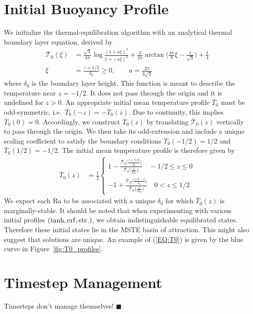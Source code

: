 \documentclass[reprint,amsmath,amssymb,aps]{revtex4-1}
\newcommand\Ra{\mathrm{Ra}}
\newcommand{\eq}[1]{(\ref{#1})}
\begin{document}
\section{Initial Buoyancy Profile} \label{sec:initial_profile}
We initialize the thermal-equilibration algorithm with an analytical thermal boundary layer equation, derived by \cite{Shishkina} 
\begin{align}
    \bar{\mathcal{T}}_0(\xi) &= \frac{\sqrt{3}}{4\pi} \log \frac{(1 + a\xi)^3}{1 + (a\xi)^3} + \frac{3}{2\pi} \arctan \Big( \frac{4\pi}{9}\xi - \frac{1}{\sqrt{3}} \Big) + \frac{1}{4} \nonumber \\
    \xi &= \frac{z + 1/2}{\delta_0} \geq 0, \qquad a = \frac{2\pi}{3\sqrt{3}}\label{EQ:T0}
\end{align}
where $\delta_0$ is the boundary layer height. 
This function is meant to describe the temperature near $z = -1/2$.
It does not pass through the origin and it is undefined for $z > 0$. 
An appropriate initial mean temperature profile $\bar{T}_0$ must be odd-symmetric, i.e.~$\bar{T}_0(-z) = -\bar{T}_0(z)$.
Due to continuity, this implies $\bar{T}_0(0) = 0$.
Accordingly, we construct $\bar{T}_0(z)$ by translating $\bar{\mathcal{T}}_0(z)$ vertically to pass through the origin.
We then take its odd-extension and include a unique scaling coefficient to satisfy the boundary conditions $\bar{T}_0(-1/2) = 1/2$ and $\bar{T}_0(1/2) = -1/2$.
The initial mean temperature profile is therefore given by
\begin{align*}
    \bar{T}_0(z) &= \frac{1}{2} \begin{cases}
        1 - \frac{\bar{\mathcal{T}}_0\big(\frac{z + 1/2}{\delta_0}\big)}{\bar{\mathcal{T}}_0\big(\frac{1}{2\delta_0}\big)} \quad -1/2 \leq z \leq 0 \\[0.5cm]
        -1 + \frac{\bar{\mathcal{T}}_0\big(\frac{1/2 - z}{\delta_0}\big)}{\bar{\mathcal{T}}_0\big(\frac{1}{2\delta_0}\big)} \quad 0 < z \leq 1/2.
    \end{cases}
\end{align*} 
 We expect each $\Ra$ to be associated with a unique $\delta_0$ for which $\bar{T}_0(z)$ is marginally-stable. 
It should be noted that when experimenting with various initial profiles $(\tanh, \rm{erf}, \rm{etc.})$, we obtain indistinguishable equilibrated states.
Therefore these initial states lie in the MSTE basin of attraction.
This might also suggest that solutions are unique. 
An example of \eq{EQ:T0} is given by the blue curve in Figure~\ref{fig:T0_profiles}.

\section{Timestep Management} \label{sec:timestep}
Timesteps don't manage themselves! $\blacksquare$
\end{document}
